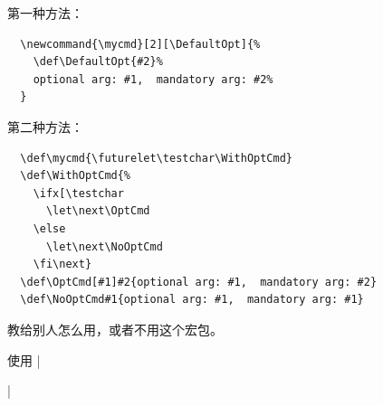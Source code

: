 


第一种方法：
\begin{verbatim}
  \newcommand{\mycmd}[2][\DefaultOpt]{%
    \def\DefaultOpt{#2}%
    optional arg: #1,  mandatory arg: #2%
  }
\end{verbatim}

第二种方法：
\begin{verbatim}
  \def\mycmd{\futurelet\testchar\WithOptCmd}
  \def\WithOptCmd{%
    \ifx[\testchar 
      \let\next\OptCmd 
    \else 
      \let\next\NoOptCmd 
    \fi\next}
  \def\OptCmd[#1]#2{optional arg: #1,  mandatory arg: #2}
  \def\NoOptCmd#1{optional arg: #1,  mandatory arg: #1}
\end{verbatim}



教给别人怎么用，或者不用这个宏包。





使用 |\usepackage{indentfirst}|
































